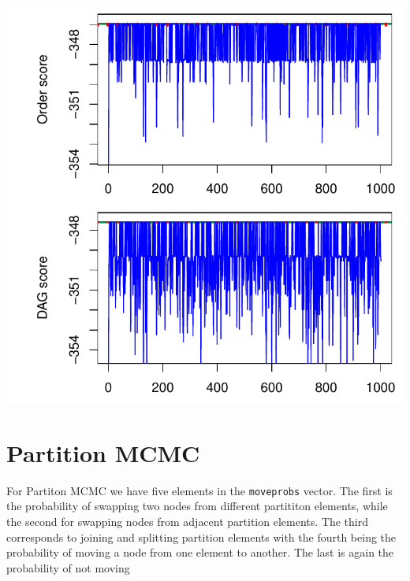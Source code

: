 \documentclass[a4paper]{article}\usepackage[]{graphicx}\usepackage[]{color}
\makeatletter
\def\maxwidth{ %
  \ifdim\Gin@nat@width>\linewidth
    \linewidth
  \else
    \Gin@nat@width
  \fi
}
\newenvironment{knitrout}{}{} %
\newcommand{\nn}{\noindent}
\makeatother
\begin{document}
\begin{knitrout}
{\centering \includegraphics[width=\maxwidth]{figure/minimal-unnamed-chunk-22-1} 

}



\end{knitrout}

\section{Partition MCMC}

\nn For Partiton MCMC we have five elements in the \texttt{moveprobs} vector.  The first is the probability of swapping two nodes from different partititon elements, while the second for swapping nodes from adjacent partition elements.  The third corresponds to joining and splitting partition elements with the fourth being the probability of moving a node from one element to another.  The last is again the probability of not moving
\end{document}
